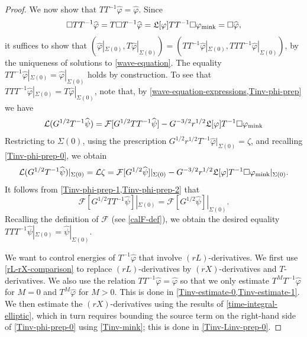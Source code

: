 \documentclass[10pt, reqno]{amsart}
\begin{document}
\begin{proof}
We now show that \(TT^{-1}\widehat{\varphi{}} = \widehat{\varphi{}}\). Since
\begin{equation}
\Box{}TT^{-1}\widehat{\varphi{}} = T\Box{}T^{-1}\widehat{\varphi{}} = \mathfrak{L}[\varphi{}]TT^{-1}\Box{}\varphi{}_{\textnormal{mink}} = \Box{}\widehat{\varphi{}},
\end{equation}
it suffices to show that \((\widehat{\varphi{}}|_{\Sigma{}(0)},T\widehat{\varphi{}}|_{\Sigma{}(0)}) =
(TT^{-1}\widehat{\varphi{}}|_{\Sigma{}(0)},TTT^{-1}\widehat{\varphi{}}|_{\Sigma{}(0)})\),
by the uniqueness of solutions to \cref{wave-equation}. The equality
\(TT^{-1}\widehat{\varphi{}}|_{\Sigma{}(0)} =
\widehat{\varphi{}}|_{\Sigma{}(0)}\) holds by construction. To see that
\(TTT^{-1}\widehat{\varphi{}}|_{\Sigma{}(0)} =
T\widehat{\varphi{}}|_{\Sigma{}(0)}\), note that, by
\cref{wave-equation-expressions,Tinv-phi-prep} we have
\begin{equation}\label{Tinv-phi-prep-1}
\mathcal{L}(G^{1/2}T^{-1}\widehat{\psi{}}) = \mathcal{F}[G^{1/2}TT^{-1}\widehat{\psi{}}] - G^{-3/2}r^{1/2}\mathfrak{L}[\varphi{}]T^{-1}\Box{}\varphi{}_{\textnormal{mink}}
\end{equation}
Restricting to \(\Sigma{}(0)\), using the prescription
\(G^{1/2}r^{1/2}T^{-1}\widehat{\varphi{}}|_{\Sigma{}(0)} = \zeta{}\), and
recalling \cref{Tinv-phi-prep-0}, we obtain
\begin{equation}\label{Tinv-phi-prep-2}
\mathcal{L}(G^{1/2}T^{-1}\widehat{\psi{}})|_{\Sigma{}(0)} = \mathcal{L}\zeta{} = \mathcal{F}[G^{1/2}\widehat{\psi{}}]|_{\Sigma{}(0)} - G^{-3/2}r^{1/2}\mathfrak{L}[\varphi{}]T^{-1}\Box{}\varphi{}_{\textnormal{mink}}|_{\Sigma{}(0)}.
\end{equation}
It follows from \cref{Tinv-phi-prep-1,Tinv-phi-prep-2} that
\begin{equation}
\mathcal{F}[G^{1/2}TT^{-1}\widehat{\psi{}}]|_{\Sigma{}(0)} = \mathcal{F}[G^{1/2}\widehat{\psi{}}]|_{\Sigma{}(0)}.
\end{equation}
Recalling the definition of \(\mathcal{F}\) (see \cref{calF-def}), we obtain the desired equality
\(TTT^{-1}\widehat{\psi{}}|_{\Sigma{}(0)} = \widehat{\psi{}}|_{\Sigma{}(0)}\).

 We want to control energies of \(T^{-1}\widehat{\varphi{}}\) that
involve \((rL)\)-derivatives. We first use \cref{rL-rX-comparison} to replace
\((rL)\)-derivatives by \((rX)\)-derivatives and \(T\)-derivatives. We also use
the relation \(TT^{-1}\widehat{\varphi{}} = \widehat{\varphi{}}\) so that we
only estimate \(T^MT^{-1}\widehat{\varphi{}}\) for \(M = 0\) and
\(T^M\widehat{\varphi{}}\) for \(M > 0\). This is done in
\cref{Tinv-estimate-0,Tinv-estimate-1}. We then estimate the \((rX)\)-derivatives
using the results of \cref{time-integral-elliptic}, which in turn requires bounding
the source term on the right-hand side of \cref{Tinv-phi-prep-0} using
\cref{Tinv-mink}; this is done in \cref{Tinv-Linv-prep-0}.


\end{proof}
\end{document}
